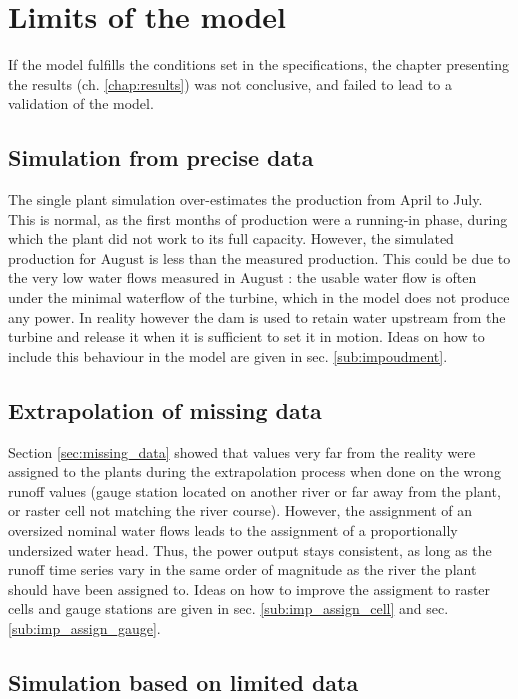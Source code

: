 \section{Limits of the model}
\label{sec:limits}
If the model fulfills the conditions set in the specifications, the chapter presenting the results (ch. \ref{chap:results}) was not conclusive, and failed to lead to a validation of the model.
\subsection{Simulation from precise data}
\label{sub:lim_single}
The single plant simulation over-estimates the production from April to July. This is normal, as the first months of production were a running-in phase, during which the plant did not work to its full capacity. However, the simulated production for August is less than the measured production. This could be due to the very low water flows measured in August : the usable water flow is often under the minimal waterflow of the turbine, which in the model does not produce any power. In reality however the dam is used to retain water upstream from the turbine and release it when it is sufficient to set it in motion. Ideas on how to include this behaviour in the model are given in sec. \ref{sub:impoudment}.

\subsection{Extrapolation of missing data}
\label{sub:lim_extra}
Section \ref{sec:missing_data} showed that values very far from the reality were assigned to the plants during the extrapolation process when done on the wrong runoff values (gauge station located on another river or far away from the plant, or raster cell not matching the river course). However, the assignment of an oversized nominal water flows leads to the assignment of a proportionally undersized water head. Thus, the power output stays consistent, as long as the runoff time series vary in the same order of magnitude as the river the plant should have been assigned to. Ideas on how to improve the assigment to raster cells and gauge stations are given in sec. \ref{sub:imp_assign_cell} and sec. \ref{sub:imp_assign_gauge}.

\subsection{Simulation based on limited data}

